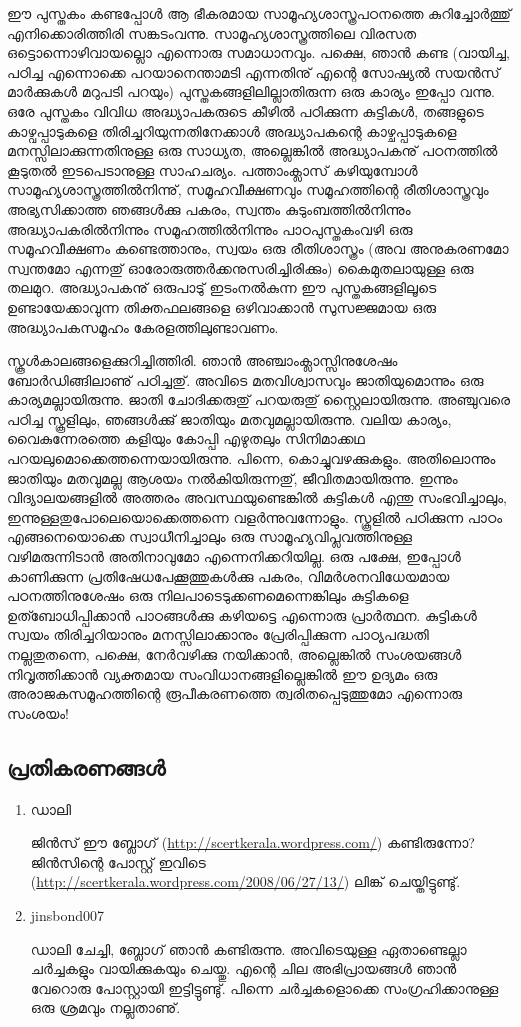 ഈ പുസ്തകം കണ്ടപ്പോള്‍ ആ ഭീകരമായ സാമൂഹ്യശാസ്ത്രപഠനത്തെ കുറിച്ചോര്‍ത്തു് എനിക്കൊരിത്തിരി സങ്കടംവന്നു. സാമൂഹ്യശാസ്ത്രത്തിലെ വിരസത ഒട്ടൊന്നൊഴിവായല്ലൊ എന്നൊരു സമാധാനവും. പക്ഷെ, ഞാന്‍ കണ്ട (വായിച്ച, പഠിച്ച എന്നൊക്കെ പറയാനെന്താമടി എന്നതിനു് എന്റെ സോഷ്യല്‍ സയന്‍സ് മാര്‍ക്കുകള്‍ മറുപടി പറയും) പുസ്തകങ്ങളിലില്ലാതിരുന്ന ഒരു കാര്യം ഇപ്പോ വന്നു. ഒരേ പുസ്തകം വിവിധ അദ്ധ്യാപകരുടെ കീഴില്‍ പഠിക്കുന്ന കുട്ടികള്‍, തങ്ങളുടെ കാഴ്വപ്പാടുകളെ തിരിച്ചറിയുന്നതിനേക്കാള്‍ അദ്ധ്യാപകന്റെ കാഴ്ചപ്പാടുകളെ മനസ്സിലാക്കുന്നതിനുള്ള ഒരു സാധ്യത, അല്ലെങ്കില്‍ അദ്ധ്യാപകനു് പഠനത്തില്‍ കൂടുതല്‍ ഇടപെടാനുള്ള സാഹചര്യം. പത്താംക്ലാസ് കഴിയുമ്പോള്‍ സാമൂഹ്യശാസ്ത്രത്തില്‍നിന്നു്, സമൂഹവീക്ഷണവും സമൂഹത്തിന്റെ രീതിശാസ്ത്രവും അഭ്യസിക്കാത്ത ഞങ്ങള്‍ക്കു പകരം, സ്വന്തം കുടുംബത്തില്‍നിന്നും അദ്ധ്യാപകരില്‍നിന്നും സമൂഹത്തില്‍നിന്നും പാഠപുസ്തകംവഴി ഒരു സമൂഹവീക്ഷണം കണ്ടെത്താനും, സ്വയം ഒരു രീതിശാസ്ത്രം (അവ അനുകരണമോ സ്വന്തമോ എന്നതു് 
ഓരോരുത്തര്‍ക്കനുസരിച്ചിരിക്കും) കൈമുതലായുള്ള ഒരു തലമുറ. അദ്ധ്യാപകനു് ഒരുപാടു് ഇടംനല്‍കുന്ന ഈ പുസ്തകങ്ങളിലൂടെ ഉണ്ടായേക്കാവുന്ന 
തിക്തഫലങ്ങളെ ഒഴിവാക്കാന്‍ സുസജ്ജമായ ഒരു അദ്ധ്യാപകസമൂഹം കേരളത്തിലുണ്ടാവണം.

സ്കൂള്‍കാലങ്ങളെക്കുറിച്ചിത്തിരി. ഞാന്‍ അഞ്ചാംക്ലാസ്സിനുശേഷം ബോര്‍ഡിങ്ങിലാണു് പഠിച്ചതു്. അവിടെ മതവിശ്വാസവും ജാതിയുമൊന്നും ഒരു കാര്യമല്ലായിരുന്നു. ജാതി ചോദിക്കരുതു് പറയരുതു് സ്റ്റൈലായിരുന്നു. അഞ്ചുവരെ പഠിച്ച സ്കൂളിലും, ഞങ്ങള്‍ക്കു് ജാതിയും മതവുമല്ലായിരുന്നു. വലിയ കാര്യം, വൈകുന്നേരത്തെ കളിയും കോപ്പി എഴുതലും സിനിമാക്കഥ പറയലുമൊക്കെത്തന്നെയായിരുന്നു. പിന്നെ, കൊച്ചുവഴക്കുകളും. അതിലൊന്നും ജാതിയും മതവുമല്ല ആശയം നല്‍കിയിരുന്നതു്, ജീവിതമായിരുന്നു. ഇന്നും വിദ്യാലയങ്ങളില്‍ അത്തരം അവസ്ഥയുണ്ടെങ്കില്‍ കുട്ടികള്‍ എന്തു സംഭവിച്ചാലും, ഇന്നുള്ളതുപോലെയൊക്കെത്തന്നെ വളര്‍ന്നുവന്നോളും. സ്കൂളില്‍ പഠിക്കുന്ന പാഠം എങ്ങനെയൊക്കെ സ്വാധീനിച്ചാലും ഒരു സാമൂഹ്യവിപ്ലവത്തിനുള്ള വഴിമരുന്നിടാന്‍ അതിനാവുമോ എന്നെനിക്കറിയില്ല. ഒരു പക്ഷേ, ഇപ്പോള്‍ കാണിക്കുന്ന 
പ്രതിഷേധപേക്കൂത്തുകള്‍ക്കു പകരം, വിമര്‍ശനവിധേയമായ പഠനത്തിനുശേഷം ഒരു നിലപാടെടുക്കണമെന്നെങ്കിലും കുട്ടികളെ ഉത്ബോധിപ്പിക്കാന്‍ പാഠങ്ങള്‍ക്കു കഴിയട്ടെ എന്നൊരു പ്രാര്‍ത്ഥന. കുട്ടികള്‍ സ്വയം തിരിച്ചറിയാനും മനസ്സിലാക്കാനും പ്രേരിപ്പിക്കുന്ന പാഠ്യപദ്ധതി നല്ലതുതന്നെ, പക്ഷെ, നേര്‍വഴിക്കു നയിക്കാന്‍, അല്ലെങ്കില്‍ സംശയങ്ങള്‍ നിവൃത്തിക്കാന്‍ വ്യക്തമായ സംവിധാനങ്ങളില്ലെങ്കില്‍ ഈ ഉദ്യമം ഒരു അരാജകസമൂഹത്തിന്റെ രൂപീകരണത്തെ ത്വരിതപ്പെടുത്തുമോ എന്നൊരു സംശയം!

\subsection*{പ്രതികരണങ്ങള്‍}

\begin{enumerate}
 \item{ഡാലി}

ജിന്‍സ് ഈ ബ്ലോഗ് (\url{http://scertkerala.wordpress.com/}) കണ്ടിരുന്നോ?  ജിന്‍സിന്റെ പോസ്റ്റ് 
ഇവിടെ (\url{http://scertkerala.wordpress.com/2008/06/27/13/}) ലിങ്ക് ചെയ്തിട്ടുണ്ടു്.
\item{jinsbond007}

ഡാലി ചേച്ചി, ബ്ലോഗ് ഞാന്‍ കണ്ടിരുന്നു. അവിടെയുള്ള ഏതാണ്ടെല്ലാ ചര്‍ച്ചകളും വായിക്കുകയും ചെയ്തു. 
എന്റെ ചില അഭിപ്രായങ്ങള്‍ ഞാന്‍ വേറൊരു പോസ്റ്റായി ഇട്ടിട്ടുണ്ടു്. പിന്നെ ചര്‍ച്ചകളൊക്കെ സംഗ്രഹിക്കാനുള്ള 
ഒരു ശ്രമവും നല്ലതാണു്.

\end{enumerate}

\newpage
